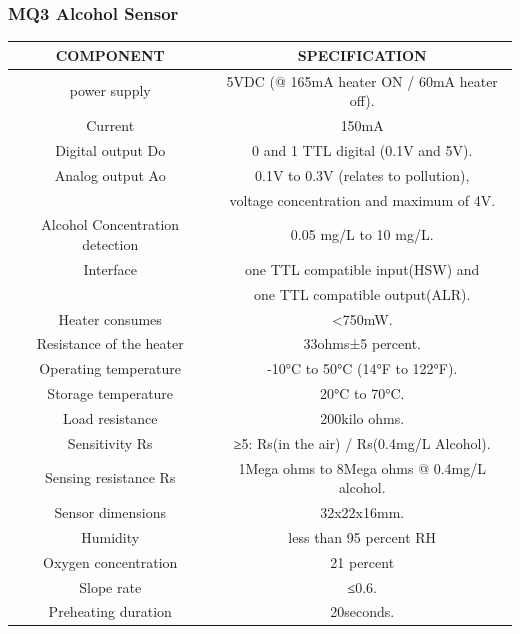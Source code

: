 \documentclass[12pt]{article}
\begin{document}
\subsubsection{MQ3 Alcohol Sensor}
\begin{tabular}{|c|c|}
    \hline
     COMPONENT & SPECIFICATION  \\
    \hline
    power supply & 5VDC (@ 165mA heater ON / 60mA heater off). \\
    \hline
    Current & 150mA \\
    \hline
    Digital output Do& 0 and 1 TTL digital (0.1V and 5V).\\
    \hline
    Analog output Ao& 0.1V to 0.3V (relates to pollution), 
    \\ & voltage concentration and maximum of 4V.\\
    \hline
    Alcohol Concentration detection& 0.05 mg/L to 10 mg/L.\\
    \hline
    Interface& one TTL compatible input(HSW) and \\ & one TTL compatible output(ALR). 
    \\
    \hline
    Heater consumes& <750mW. \\
    \hline
    Resistance of the heater& 33ohms±5 percent. \\
    \hline
    Operating temperature& -10°C to 50°C (14°F to 122°F).\\
    Storage temperature& 20°C to 70°C. \\
    \hline
    Load resistance & 200kilo ohms.\\
    \hline
    Sensitivity Rs& ≥5: Rs(in the air) / Rs(0.4mg/L Alcohol).\\
    \hline
    Sensing resistance Rs& 1Mega ohms to 8Mega ohms @ 0.4mg/L alcohol.\\
    \hline
    Sensor dimensions&32x22x16mm.\\
    \hline
    Humidity & less than 95 percent RH  \\
    \hline
    Oxygen concentration& 21 percent  \\
    \hline
    Slope rate& ≤0.6. \\
    \hline
    Preheating duration& 20seconds.\\
    \hline
\end{tabular}
\end{document}
